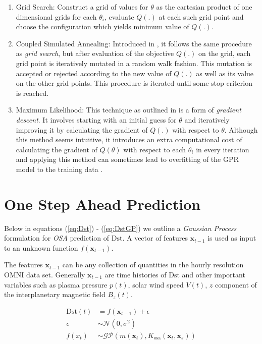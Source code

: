 \begin{enumerate}
\item Grid Search: Construct a grid of values for $\theta$ as the cartesian product of one dimensional grids for each $\theta_i$, evaluate $Q(.)$ at each such grid point and choose the configuration which yields minimum value of $Q(.)$.

\item Coupled Simulated Annealing: Introduced in \citet{Xavier-De-Souza2010}, it follows the same procedure as \emph{grid search}, but after evaluation of the objective $Q(.)$ on the grid, each grid point is iteratively mutated in a random walk fashion. This mutation is accepted or rejected according to the new value of $Q(.)$ as well as its value on the other grid points. This procedure is iterated until some stop criterion is reached.

\item Maximum Likelihood: This technique as outlined in \citet{Rasmussen:2005:GPM:1162254} is a form of \emph{gradient descent}. It involves starting with an initial guess for $\theta$ and iteratively improving it by calculating the gradient of $Q(.)$ with respect to $\theta$. Although this method seems intuitive, it introduces an extra computational cost of calculating the gradient of $Q(\theta)$ with respect to each $\theta_i$ in every iteration and applying this method can sometimes lead to overfitting of the GPR model to the training data \citet{Rasmussen:2005:GPM:1162254}.

\end{enumerate}

\section{One Step Ahead Prediction} \label{sec:osa}

Below in equations (\ref{eq:Dst}) - (\ref{eq:DstGP}) we outline a \emph{Gaussian Process} formulation for \emph{OSA} prediction of $ \mathrm{Dst}$. A vector of features $\mathbf{x}_{t-1}$ is used as input to an unknown function $f(\mathbf{x}_{t-1})$.

The features $ \mathbf{x}_{t-1}$ can be any collection of quantities in the hourly resolution OMNI data set. Generally $\mathbf{x}_{t-1}$ are time histories of $\mathrm{Dst}$ and other important variables such as plasma pressure $p(t)$, solar wind speed $V(t)$, $z$ component of the interplanetary magnetic field $B_z(t)$.


\begin{align}
    \mathrm{Dst}(t) & =  f(\mathbf{x}_{t-1}) + \epsilon \label{eq:Dst} \\
    \epsilon & \sim  \mathcal{N}(0, \sigma^2) \label{eq:GPNoise} \\
    f(x_t) & \sim  \mathcal{GP}(m(\mathbf{x}_t), K_{\text{osa}}(\mathbf{x}_t, \mathbf{x}_s)) \label{eq:DstGP}
\end{align}

